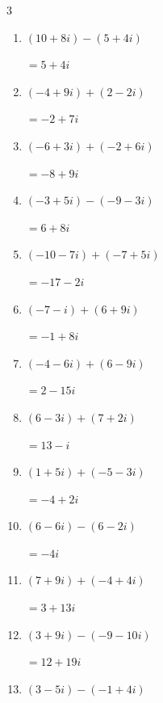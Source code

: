\begin{multicols}{3}
\begin{enumerate}
        $\displaystyle =-1+17i$

  \item $\displaystyle (10+8i) - (5+4i)$

        $\displaystyle =5+4i$

  \item $\displaystyle (-4+9i) + (2-2i)$

        $\displaystyle =-2+7i$

\columnbreak %

\resetques

  \item $\displaystyle (-6+3i) + (-2+6i)$

        $\displaystyle =-8+9i$

  \item $\displaystyle (-3+5i) - (-9-3i)$

        $\displaystyle =6+8i$

  \item $\displaystyle (-10-7i) + (-7+5i)$

        $\displaystyle =-17-2i$

  \item $\displaystyle (-7-i) + (6+9i)$

        $\displaystyle =-1+8i$

  \item $\displaystyle (-4-6i) + (6-9i)$

        $\displaystyle =2-15i$

  \item $\displaystyle (6-3i) + (7+2i)$

        $\displaystyle =13-i$

  \item $\displaystyle (1+5i) + (-5-3i)$

        $\displaystyle =-4+2i$

  \item $\displaystyle (6-6i) - (6-2i)$

        $\displaystyle =-4i$

  \item $\displaystyle (7+9i) + (-4+4i)$

        $\displaystyle =3+13i$

  \item $\displaystyle (3+9i) - (-9-10i)$

        $\displaystyle =12+19i$

  \item $\displaystyle (3-5i) - (-1+4i)$


\end{enumerate}
\end{multicols}
